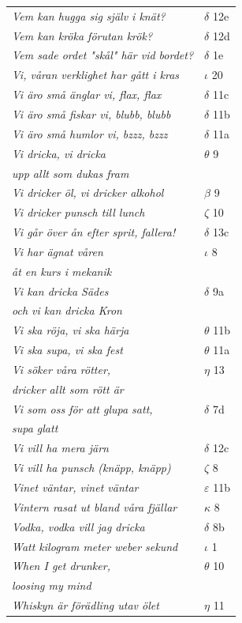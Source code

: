 \documentclass[a6paper,10pt]{article}
\begin{document}
\newpage
\begin{table}[!h]
\begin{tabular}{l l}
\textit{Vem kan hugga sig själv i knät?}	&$\delta$ 12e\\
\textit{Vem kan kröka förutan krök?}	&$\delta$ 12d\\
\textit{Vem sade ordet "skål" här vid bordet?}	&$\delta$ 1e\\
\textit{Vi, våran verklighet har gått i kras}&$\iota$ 20\\
\textit{Vi äro små änglar vi, flax, flax}	&$\delta$ 11c\\
\textit{Vi äro små fiskar vi, blubb, blubb}	&$\delta$ 11b\\
\textit{Vi äro små humlor vi, bzzz, bzzz}	&$\delta$ 11a\\
\textit{Vi dricka, vi dricka}	&$\theta$ 9\\
\textit{upp allt som dukas fram} &\\
\textit{Vi dricker öl, vi dricker alkohol}	&$\beta$ 9\\
\textit{Vi dricker punsch till lunch}	&$\zeta$ 10\\
\textit{Vi går över ån efter sprit, fallera!}	&$\delta$ 13c\\
\textit{Vi har ägnat våren}	&$\iota$ 8\\
\textit{åt en kurs i mekanik} &\\
\textit{Vi kan dricka Sädes}	&$\delta$ 9a\\
\textit{och vi kan dricka Kron} &\\
\textit{Vi ska röja, vi ska härja}	&$\theta$ 11b\\
\textit{Vi ska supa, vi ska fest}	&$\theta$ 11a\\
\textit{Vi söker våra rötter,}	&$\eta$ 13\\
\textit{dricker allt som rött är} &\\
\textit{Vi som oss för att glupa satt,}	&$\delta$ 7d\\
\textit{supa glatt} &\\
\textit{Vi vill ha mera järn}	&$\delta$ 12c\\
\textit{Vi vill ha punsch (knäpp, knäpp)}	&$\zeta$ 8\\
\textit{Vinet väntar, vinet väntar}	&$\varepsilon$ 11b\\
\textit{Vintern rasat ut bland våra fjällar}	&$\kappa$ 8\\
\textit{Vodka, vodka vill jag dricka}	&$\delta$ 8b\\
\textit{Watt kilogram meter weber sekund}	&$\iota$ 1\\
\textit{When I get drunker,}	&$\theta$ 10\\
\textit{loosing my mind} &\\
\textit{Whiskyn är förädling utav ölet}	&$\eta$ 11\\
\end{tabular}
\end{table}
\end{document}
